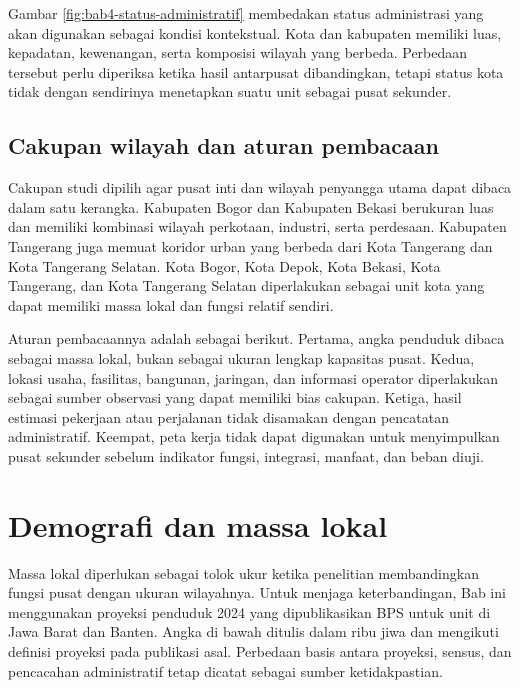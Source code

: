 \documentclass[11pt,a4paper,oneside,openany,indonesian]{report}
\begin{document}
Gambar \ref{fig:bab4-status-administratif} membedakan status administrasi yang akan digunakan sebagai kondisi kontekstual. Kota dan kabupaten memiliki luas, kepadatan, kewenangan, serta komposisi wilayah yang berbeda. Perbedaan tersebut perlu diperiksa ketika hasil antarpusat dibandingkan, tetapi status kota tidak dengan sendirinya menetapkan suatu unit sebagai pusat sekunder.

\subsection{Cakupan wilayah dan aturan pembacaan}

Cakupan studi dipilih agar pusat inti dan wilayah penyangga utama dapat dibaca dalam satu kerangka. Kabupaten Bogor dan Kabupaten Bekasi berukuran luas dan memiliki kombinasi wilayah perkotaan, industri, serta perdesaan. Kabupaten Tangerang juga memuat koridor urban yang berbeda dari Kota Tangerang dan Kota Tangerang Selatan. Kota Bogor, Kota Depok, Kota Bekasi, Kota Tangerang, dan Kota Tangerang Selatan diperlakukan sebagai unit kota yang dapat memiliki massa lokal dan fungsi relatif sendiri.

Aturan pembacaannya adalah sebagai berikut. Pertama, angka penduduk dibaca sebagai massa lokal, bukan sebagai ukuran lengkap kapasitas pusat. Kedua, lokasi usaha, fasilitas, bangunan, jaringan, dan informasi operator diperlakukan sebagai sumber observasi yang dapat memiliki bias cakupan. Ketiga, hasil estimasi pekerjaan atau perjalanan tidak disamakan dengan pencatatan administratif. Keempat, peta kerja tidak dapat digunakan untuk menyimpulkan pusat sekunder sebelum indikator fungsi, integrasi, manfaat, dan beban diuji.

\section{Demografi dan massa lokal}

Massa lokal diperlukan sebagai tolok ukur ketika penelitian membandingkan fungsi pusat dengan ukuran wilayahnya. Untuk menjaga keterbandingan, Bab ini menggunakan proyeksi penduduk 2024 yang dipublikasikan BPS untuk unit di Jawa Barat dan Banten. Angka di bawah ditulis dalam ribu jiwa dan mengikuti definisi proyeksi pada publikasi asal. Perbedaan basis antara proyeksi, sensus, dan pencacahan administratif tetap dicatat sebagai sumber ketidakpastian.
\end{document}
